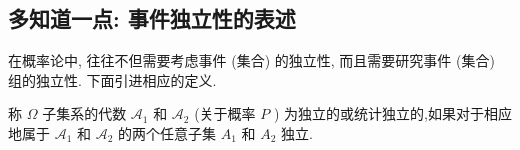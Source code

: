 \subsection*{多知道一点: 事件独立性的表述}
在概率论中, 往往不但需要考虑事件 (集合) 的独立性, 而且需要研究事件 (集合) 组的独立性. 下面引进相应的定义.
\begin{definition*}
    称 $\Omega$ 子集系的代数 $\mathscr{A}_1$ 和 $\mathscr{A}_2$ (关于概率 $P$ ) 为独立的或统计独立的,如果对于相应地属于 $\mathscr{A}_1$ 和 $\mathscr{A}_2$ 的两个任意子集 $A_1$ 和 $A_2$ 独立.
\end{definition*}

